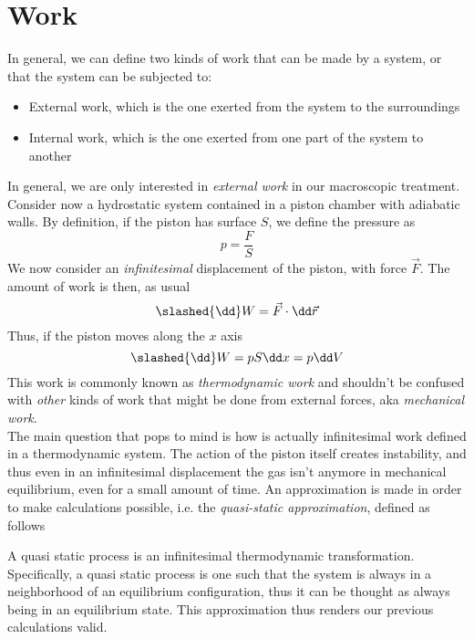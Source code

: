 \documentclass[../qm.tex]{subfiles}
\begin{document}
\section{Work}
In general, we can define two kinds of work that can be made by a system, or that the system can be subjected to:
\begin{itemize}
\item External work, which is the one exerted from the system to the surroundings
\item Internal work, which is the one exerted from one part of the system to another
\end{itemize}
In general, we are only interested in \textit{external work} in our macroscopic treatment.\\
Consider now a hydrostatic system contained in a piston chamber with adiabatic walls. By definition, if the piston has surface $S$, we define the pressure as
\begin{equation}
	p=\frac{F}{S}
	\label{eq:presshyd.work}
\end{equation}
We now consider an \textit{infinitesimal} displacement of the piston, with force $\vec{F}$. The amount of work is then, as usual
\begin{equation}
	\slashed{\dd} W = \vec{F}\cdot\dd\vec{r}
	\label{eq:workinf.work}
\end{equation}
Thus, if the piston moves along the $x$ axis
\begin{equation}
	\slashed{\dd}W=pS\dd x=p\dd V
	\label{eq:workthermo.work}
\end{equation}
This work is commonly known as \textit{thermodynamic work} and shouldn't be confused with \textit{other} kinds of work that might be done from external forces, aka \textit{mechanical work}.\\
The main question that pops to mind is how is actually infinitesimal work defined in a thermodynamic system. The action of the piston itself creates instability, and thus even in an infinitesimal displacement the gas isn't anymore in mechanical equilibrium, even for a small amount of time. An approximation is made in order to make calculations possible, i.e. the \textit{quasi-static approximation}, defined as follows
\begin{dfn}
	A quasi static process is an infinitesimal thermodynamic transformation. Specifically, a quasi static process is one such that the system is always in a neighborhood of an equilibrium configuration, thus it can be thought as always being in an equilibrium state. This approximation thus renders our previous calculations valid.
\end{dfn}
\end{document}
